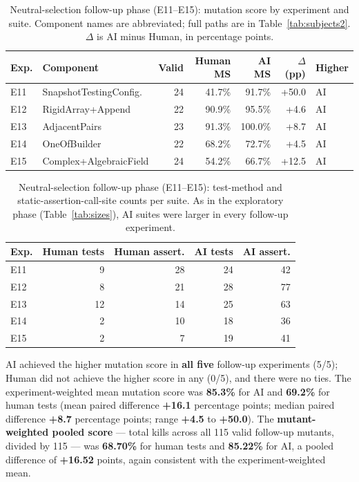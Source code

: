 \documentclass[10pt,conference]{IEEEtran}
\begin{document}
\begin{table}[ht]
\centering
\caption{Neutral-selection follow-up phase (E11--E15): mutation score by experiment and suite. Component names are abbreviated; full paths are in Table~\ref{tab:subjects2}. $\Delta$ is AI minus Human, in percentage points.}
\label{tab:confresults}
\small
\begin{tabular}{llrrrrl}
\toprule
Exp. & Component & Valid & Human MS & AI MS & $\Delta$ (pp) & Higher \\
\midrule
E11 & SnapshotTestingConfig. & 24 & 41.7\% & 91.7\% & +50.0 & AI \\
E12 & RigidArray+Append & 22 & 90.9\% & 95.5\% & +4.6 & AI \\
E13 & AdjacentPairs & 23 & 91.3\% & 100.0\% & +8.7 & AI \\
E14 & OneOfBuilder & 22 & 68.2\% & 72.7\% & +4.5 & AI \\
E15 & Complex+AlgebraicField & 24 & 54.2\% & 66.7\% & +12.5 & AI \\
\bottomrule
\end{tabular}
\end{table}

\begin{table}[ht]
\centering
\caption{Neutral-selection follow-up phase (E11--E15): test-method and static-assertion-call-site counts per suite. As in the exploratory phase (Table~\ref{tab:sizes}), AI suites were larger in every follow-up experiment.}
\label{tab:sizes2}
\small
\begin{tabular}{lrrrr}
\toprule
Exp. & Human tests & Human assert. & AI tests & AI assert. \\
\midrule
E11 & 9 & 28 & 24 & 42 \\
E12 & 8 & 21 & 28 & 77 \\
E13 & 12 & 14 & 25 & 63 \\
E14 & 2 & 10 & 18 & 36 \\
E15 & 2 & 7 & 19 & 41 \\
\bottomrule
\end{tabular}
\end{table}

AI achieved the higher mutation score in \textbf{all five} follow-up experiments (5/5); Human did not achieve the higher score in any (0/5), and there were no ties. The experiment-weighted mean mutation score was \textbf{85.3\%} for AI and \textbf{69.2\%} for human tests (mean paired difference \textbf{+16.1} percentage points; median paired difference \textbf{+8.7} percentage points; range \textbf{+4.5} to \textbf{+50.0}). The \textbf{mutant-weighted pooled score} — total kills across all 115 valid follow-up mutants, divided by 115 — was \textbf{68.70\%} for human tests and \textbf{85.22\%} for AI, a pooled difference of \textbf{+16.52} points, again consistent with the experiment-weighted mean.
\end{document}
